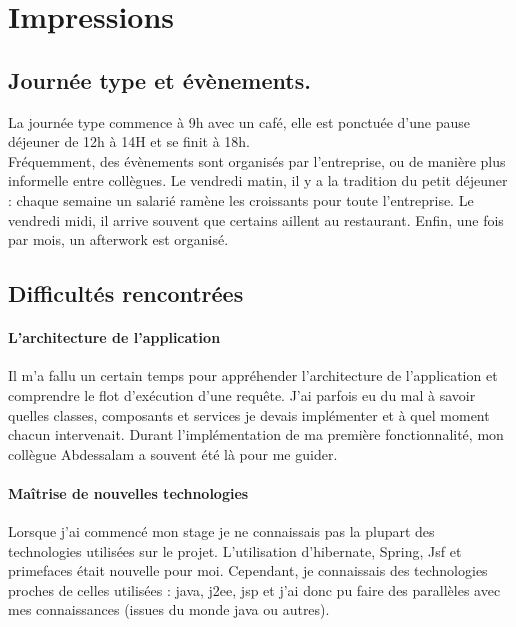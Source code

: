 \newpage
\section*{Impressions} %
\subsection{Journée type et évènements.}
La journée type commence à 9h avec un café, elle est ponctuée d'une pause déjeuner de 12h à 14H et se finit à 18h.\\
Fréquemment, des évènements sont organisés par l'entreprise, ou de manière plus informelle entre collègues.
Le vendredi matin, il y a la tradition du petit déjeuner : chaque semaine un salarié ramène les croissants pour toute l’entreprise. Le vendredi midi, il arrive souvent que certains aillent au restaurant. 
Enfin, une fois par mois, un afterwork est organisé.

\subsection{Difficultés rencontrées}
\paragraph*{L’architecture de l’application\\}
Il m’a fallu un certain temps pour appréhender l’architecture de l’application et comprendre le flot d’exécution d’une requête.
J’ai parfois eu du mal à savoir quelles classes, composants et services je devais implémenter et à quel moment chacun intervenait. Durant l'implémentation de ma première fonctionnalité, mon collègue Abdessalam a souvent été là pour me guider.

\paragraph*{Maîtrise de nouvelles technologies\\}
Lorsque j’ai commencé mon stage je ne connaissais pas la plupart des technologies utilisées sur le projet. L'utilisation d'hibernate, Spring, Jsf et primefaces était nouvelle pour moi. Cependant, je connaissais des technologies proches de celles utilisées : java, j2ee, jsp et j'ai donc pu faire des parallèles avec mes connaissances (issues du monde java ou autres).

